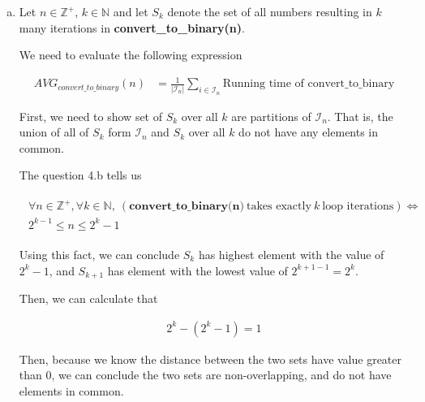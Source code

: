 \documentclass[12pt]{article}
\begin{document}
\begin{enumerate}[a.]
\begin{mdframed}
    \end{mdframed}

    \item

    Let $n \in \mathbb{Z}^+$, $k \in \mathbb{N}$ and let $S_k$ denote the set
    of all numbers resulting in $k$ many iterations in \textbf{convert\_to\_binary(n)}.

    \bigskip

    We need to evaluate the following expression

    \setcounter{equation}{0}
    \begin{align}
        AVG_{convert\_to\_binary}(n) &= \frac{1}{\lvert \mathcal{I}_n \rvert} \sum\limits_{i \in \mathcal{I}_n} \text{Running time of convert\_to\_binary}
    \end{align}

    \bigskip

    First, we need to show set of $S_k$ over all $k$ are partitions of $\mathcal{I}_n$.
    That is, the union of all of $S_k$ form $\mathcal{I}_n$ and $S_k$ over all $k$ do
    not have any elements in common.

    \bigskip

    The question 4.b tells us

    \begin{align}
        \begin{split}
        \forall n \in \mathbb{Z}^+, \forall k \in \mathbb{N},\: (\textbf{
        convert\_to\_binary(n)}\:\text{takes exactly}\:k\:\text{loop iterations}) \Leftrightarrow
        \\ 2^{k-1} \leq n \leq 2^k -1
        \end{split}
    \end{align}

    Using this fact, we can conclude $S_k$ has highest element with the value of $2^k - 1$,
    and $S_{k+1}$ has element with the lowest value of $2^{k+1-1}=2^k$.

    \bigskip

    Then, we can calculate that

    \begin{align}
        2^k - (2^k - 1) = 1
    \end{align}

    \bigskip

    Then, because we know the distance between the two sets have value greater than 0, we can
    conclude the two sets are non-overlapping, and do not have elements in common.


\end{enumerate}
\end{document}
